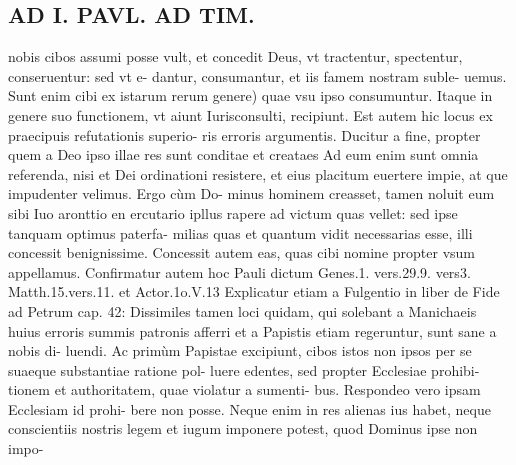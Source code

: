 \documentclass{article}
\begin{document}
\begin{pages}
\section*{AD I. PAVL. AD TIM. }
\marginpar{[ p.192 ]}\pstart nobis cibos assumi posse vult, et concedit Deus, vt tractentur, spectentur, conseruentur: sed vt e- dantur, consumantur, et iis famem nostram suble- uemus. Sunt enim cibi ex istarum rerum genere) quae vsu ipso consumuntur. Itaque in genere suo functionem, vt aiunt Iurisconsulti, recipiunt. Est autem hic locus ex praecipuis refutationis superio- ris erroris argumentis. Ducitur a fine, propter quem a Deo ipso illae res sunt conditae et creataes Ad eum enim sunt omnia referenda, nisi et Dei ordinationi resistere, et eius placitum euertere impie, at que impudenter velimus. Ergo cùm Do- minus hominem creasset, tamen noluit eum sibi Iuo aronttio en ercutario ipllus rapere ad victum quas vellet: sed ipse tanquam optimus paterfa- milias quas et quantum vidit necessarias esse, illi concessit benignissime. Concessit autem eas, quas cibi nomine propter vsum appellamus.  \pend\pstart Confirmatur autem hoc Pauli dictum Genes.1. vers.29.9. vers3. Matth.15.vers.11. et Actor.1o.V.13 Explicatur etiam a Fulgentio in liber  de Fide ad Petrum cap. 42:  \pend\pstart Dissimiles tamen loci quidam, qui solebant a Manichaeis huius erroris summis patronis afferri et a Papistis etiam regeruntur, sunt sane a nobis di- luendi. Ac primùm Papistae excipiunt, cibos istos non ipsos per se suaeque substantiae ratione pol- luere edentes, sed propter Ecclesiae prohibi- tionem et authoritatem, quae violatur a sumenti- bus. Respondeo vero ipsam Ecclesiam id prohi- bere non posse. Neque enim in res alienas ius habet, neque conscientiis nostris legem et iugum imponere potest, quod Dominus ipse non impo-  \pend

\end{pages}
\end{document}

